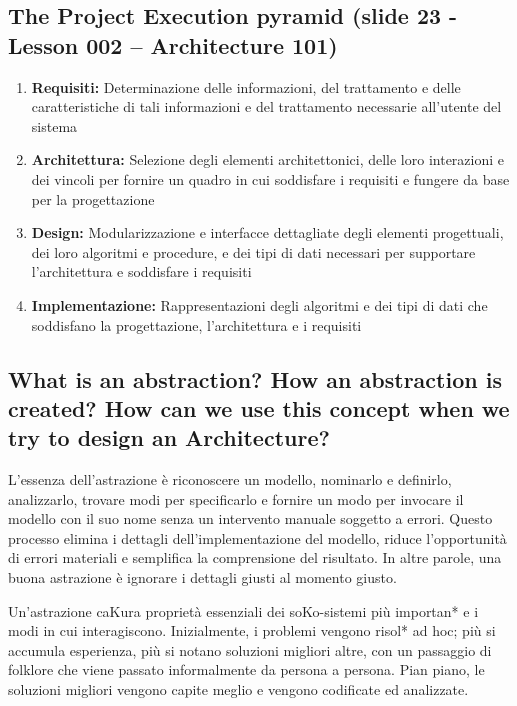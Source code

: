 \documentclass{article}
\begin{document}
\subsection{The Project Execution pyramid (slide 23 - Lesson 002 – Architecture 101)}
\begin{enumerate}
    \item \textbf{Requisiti:} Determinazione delle informazioni, del trattamento e delle caratteristiche di tali informazioni e del trattamento necessarie all'utente del sistema
    \item \textbf{Architettura:} Selezione degli elementi architettonici, delle loro interazioni e dei vincoli per fornire un quadro in cui soddisfare i requisiti e fungere da base per la progettazione
    \item \textbf{Design:} Modularizzazione e interfacce dettagliate degli elementi progettuali, dei loro algoritmi e procedure, e dei tipi di dati necessari per supportare l'architettura e soddisfare i requisiti
    \item \textbf{Implementazione:} Rappresentazioni degli algoritmi e dei tipi di dati che soddisfano la progettazione, l'architettura e i requisiti

\end{enumerate}
\subsection{What is an abstraction? How an abstraction is created? How can we use this concept when we try to design an Architecture?}
L'essenza dell'astrazione è riconoscere un modello, nominarlo e definirlo, analizzarlo, trovare modi per specificarlo e fornire un modo per invocare il modello con il suo nome senza un intervento manuale soggetto a errori.
Questo processo elimina i dettagli dell'implementazione del modello, riduce l'opportunità di errori materiali e semplifica la comprensione del risultato.
In altre parole, una buona astrazione è ignorare i dettagli giusti al momento giusto.

Un’astrazione caKura proprietà essenziali dei soKo-sistemi più importan* e i modi in cui interagiscono. Inizialmente, i problemi vengono risol* ad hoc; più si accumula esperienza, più si notano soluzioni migliori altre, con un passaggio di folklore che viene passato informalmente da persona a persona. Pian piano, le soluzioni migliori vengono capite meglio e vengono codificate ed analizzate.
\end{document}
